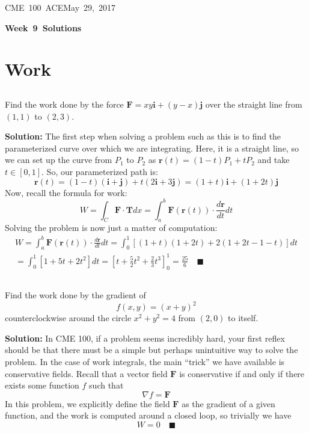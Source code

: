 \documentclass[letterpaper, 11pt]{article}
\makeatletter
\newcommand{\hmwkTitle}{Week\ 9\ Solutions} %
\newcommand{\hmwkClass}{CME\ 100\ ACE} %
\newcommand{\hmwkAuthorName}{Timothy Anderson} %
\newcommand{\hmwkAuthorEmail}{timmya@stanford.edu} %
\makeatother
\begin{document}
\noindent
\normalsize 
\hmwkClass \hfill May\ 29,\ 2017\\

\begin{center} \Large \textbf{\hmwkTitle} \end{center}

\section{Work}
\subsection{} Find the work done by the force $\bm{F} = xy\bm{i}+(y-x)\bm{j}$ over the straight line from $(1,1)$ to $(2, 3)$.
\par \textbf{Solution:} The first step when solving a problem such as this is to find the parameterized curve over which we are integrating. Here, it is a straight line, so we can set up the curve from $P_1$ to $P_2$ as $\bm{r}(t) = (1-t)P_1 + tP_2 $ and take $t \in [0,1]$. So, our parameterized path is:
\[ \bm{r}(t) = (1 -t)(\bm{i} + \bm{j}) + t(2\bm{i} + 3\bm{j}) = (1+t)\bm{i} + (1 + 2t)\bm{j} \]
Now, recall the formula for work:
\[ W = \int_C \bm{F} \cdot \bm{T} dx = \int_a^b \bm{F}(\bm{r}(t)) \cdot \frac{ d\bm{r}}{dt}dt \]
Solving the problem is now just a matter of computation:
\begin{gather*}
 W =  \int_a^b \bm{F}(\bm{r}(t)) \cdot \frac{ d\bm{r}}{dt}dt = \int_0^1 \left[ (1+t)(1 + 2t) + 2(1+2t - 1 - t)\right]dt \\
= \int_0^1 \left[ 1 + 5t + 2t^2  \right] dt = \left[ t + \frac{5}{2} t^2 + \frac{2}{3} t^3 \right]_0^1 = \frac{25}{6} \quad\blacksquare
\end{gather*}

\subsection{} Find the work done by the gradient of \[f(x, y) = (x + y)^2\] counterclockwise around the circle $x^2 + y^2 = 4$ from $(2, 0)$ to itself.
\par \textbf{Solution:} In CME 100, if a problem seems incredibly hard, your first reflex should be that there must be a simple but perhaps unintuitive way to solve the problem. In the case of work integrals, the main ``trick'' we have available is conservative fields. Recall that a vector field $\bm{F}$ is conservative if and only if there exists some function $f$ such that
\[ \nabla f = \bm{F}\]
In this problem, we explicitly define the field $\bm{F}$ as the gradient of a given function, and the work is computed around a closed loop, so trivially we have
\[ W = 0 \quad \blacksquare \]
\end{document}
